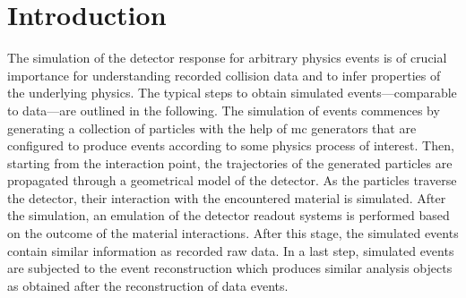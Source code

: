 


\section{Introduction}

The simulation of the detector response for arbitrary physics events is of crucial importance for understanding recorded collision data and to infer properties of the underlying physics. The typical steps to obtain simulated events---comparable to data---are outlined in the following. The simulation of events commences by generating a collection of particles with the help of \acrfull{mc} generators that are configured to produce events according to some physics process of interest. Then, starting from the interaction point, the trajectories of the generated particles are propagated through a geometrical model of the detector. As the particles traverse the detector, their interaction with the encountered material is simulated. After the simulation, an emulation of the detector readout systems is performed based on the outcome of the material interactions. After this stage, the simulated events contain similar information as recorded raw data. In a last step, simulated events are subjected to the event reconstruction which produces similar analysis objects as obtained after the reconstruction of data events.  

